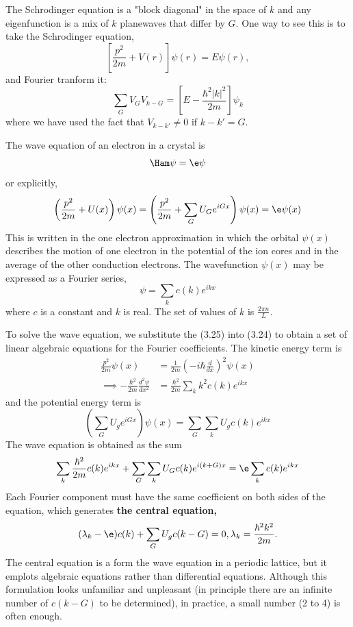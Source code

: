 \documentclass[a4paper, 11pt, normalem]{report}
\begin{document}
The Schrodinger equation is a "block diagonal" in the space of $k$ and any eigenfunction is a mix of $k$ planewaves that differ by $G$.
One way to see this is to take the Schrodinger equation, 
\begin{equation}
    \left[\frac{p^2}{2m} + V(r)\right]\psi(r) = E\psi(r),
\end{equation}
and Fourier tranform it:
\begin{equation}
    \sum_G V_G V_{k-G} = \left[E - \frac{\hbar^2|k|^2}{2m}\right]\psi_k
\end{equation}
where we have used the fact that $V_{k-k'} \neq 0$ if $k-k' = G$.

The wave equation of an electron in a crystal is
\begin{equation}
    \Ham\psi = \e\psi
\end{equation}
or explicitly,
\begin{align}
    \left(\frac{p^2}{2m} + U(x)\right)\psi(x) = \left(\frac{p^2}{2m} + \sum_G U_Ge^{iGx}\right) \psi(x) = \e\psi(x)
\end{align}
This is written in the one electron approximation in which the orbital $\psi(x)$ describes the motion of one electron in the potential of the ion cores and in the average of the other conduction electrons.
The wavefunction $\psi(x)$ may be expressed as a Fourier series,
\begin{equation}
    \psi = \sum_k c(k)e^{ikx}
\end{equation}
where $c$ is a constant and $k$ is real.
The set of values of $k$ is $\frac{2\pi n}{L}$.

To solve the wave equation, we substitute the (3.25) into (3.24) to obtain a set of linear algebraic equations for the Fourier coefficients.
The kinetic energy term is
\begin{align}
    \frac{p^2}{2m}\psi(x) &= \frac{1}{2m}\left(-i\hbar\frac{d}{dx}\right)^2\psi(x) \\
    \implies -\frac{\hbar^2}{2m}\frac{d^2\psi}{dx^2} &= \frac{\hbar^2}{2m} \sum_k k^2c(k)e^{ikx}
\end{align}
and the potential energy term is 
\begin{equation}
    \left(\sum_G U_ge^{iGx}\right)\psi(x) = \sum_G\sum_k U_gc(k)e^{ikx}
\end{equation}
The wave equation is obtained as the sum
\begin{equation}
    \sum_k \frac{\hbar^2}{2m}c(k)e^{ikx} + \sum_G\sum_k U_Gc(k)e^{i(k+G)x} = \e\sum_k c(k)e^{ikx}
\end{equation}
Each Fourier component must have the same coefficient on both sides of the equation, which generates \textbf{the central equation,}
\begin{equation}
    (\lambda_k - \e)c(k) + \sum_G U_gc(k-G) = 0, \lambda_k = \frac{\hbar^2 k^2}{2m}.
\end{equation}
The central equation is a form the wave equation in a periodic lattice, but it emplots algebraic equations rather than differential equations.
Although this formulation looks unfamiliar and unpleasant (in principle there are an infinite number of $c(k-G)$ to be determined), in practice, a small number (2 to 4) is often enough. 
\end{document}
